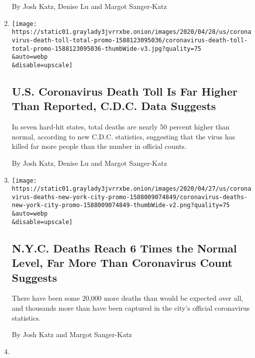 \begin{enumerate}
  By Josh Katz, Denise Lu and Margot Sanger-Katz
\item
  \href{/interactive/2020/04/28/us/coronavirus-death-toll-total.html}{}

  \texttt{[image: https://static01.graylady3jvrrxbe.onion/images/2020/04/28/us/coronavirus-death-toll-total-promo-1588123095036/coronavirus-death-toll-total-promo-1588123095036-thumbWide-v3.jpg?quality=75\\\&auto=webp\\\&disable=upscale]}

  \hypertarget{us-coronavirus-death-toll-is-far-higher-than-reported-cdc-data-suggests}{%
  \subsection{U.S. Coronavirus Death Toll Is Far Higher Than Reported,
  C.D.C. Data
  Suggests}\label{us-coronavirus-death-toll-is-far-higher-than-reported-cdc-data-suggests}}

  In seven hard-hit states, total deaths are nearly 50 percent higher
  than normal, according to new C.D.C. statistics, suggesting that the
  virus has killed far more people than the number in official counts.

  By Josh Katz, Denise Lu and Margot Sanger-Katz
\item
  \href{/interactive/2020/04/27/upshot/coronavirus-deaths-new-york-city.html}{}

  \texttt{[image: https://static01.graylady3jvrrxbe.onion/images/2020/04/27/us/coronavirus-deaths-new-york-city-promo-1588009074849/coronavirus-deaths-new-york-city-promo-1588009074849-thumbWide-v2.png?quality=75\\\&auto=webp\\\&disable=upscale]}

  \hypertarget{nyc-deaths-reach-6-times-the-normal-level-far-more-than-coronavirus-count-suggests}{%
  \subsection{N.Y.C. Deaths Reach 6 Times the Normal Level, Far More
  Than Coronavirus Count
  Suggests}\label{nyc-deaths-reach-6-times-the-normal-level-far-more-than-coronavirus-count-suggests}}

  There have been some 20,000 more deaths than would be expected over
  all, and thousands more than have been captured in the city's official
  coronavirus statistics.

  By Josh Katz and Margot Sanger-Katz
\item
  \href{/interactive/2020/04/22/upshot/coronavirus-models.html}{}


\end{enumerate}

